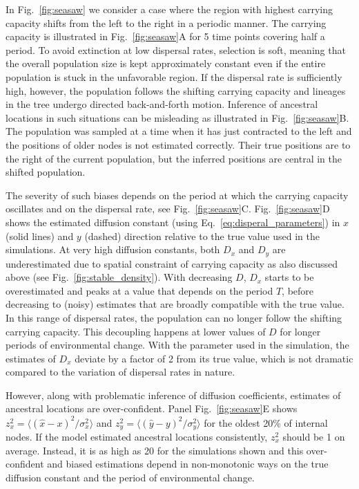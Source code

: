 \documentclass[aps,rmp, twocolumn]{revtex4}
\begin{document}
In Fig.~\ref{fig:seasaw} we consider a case where the region with highest carrying capacity shifts from the left to the right in a periodic manner.
The carrying capacity is illustrated in Fig.~\ref{fig:seasaw}A for 5 time points covering half a period.
To avoid extinction at low dispersal rates, selection is soft, meaning that the overall population size is kept approximately constant even if the entire population is stuck in the unfavorable region.
If the dispersal rate is sufficiently high, however, the population follows the shifting carrying capacity and lineages in the tree undergo directed back-and-forth motion.
Inference of ancestral locations in such situations can be misleading as illustrated in Fig.~\ref{fig:seasaw}B.
The population was sampled at a time when it has just contracted to the left and the positions of older nodes is not estimated correctly.
Their true positions are to the right of the current population, but the inferred positions are central in the shifted population.

The severity of such biases depends on the period at which the carrying capacity oscillates and on the dispersal rate, see  Fig.~\ref{fig:seasaw}C.
Fig.~\ref{fig:seasaw}D shows the estimated diffusion constant (using Eq.~\ref{eq:disperal_parameters}) in $x$ (solid lines) and $y$ (dashed) direction relative to the true value used in the simulations.
At very high diffusion constants, both $D_x$ and $D_y$ are underestimated due to spatial constraint of carrying capacity as also discussed above (see Fig.~\ref{fig:stable_density}).
With decreasing $D$, $D_x$ starts to be overestimated and peaks at a value that depends on the period $T$, before decreasing to (noisy) estimates that are broadly compatible with the true value.
In this range of dispersal rates, the population can no longer follow the shifting carrying capacity.
This decoupling happens at lower values of $D$ for longer periods of environmental change.
With the parameter used in the simulation, the estimates of $D_x$ deviate by a factor of 2 from its true value, which is not dramatic compared to the variation of dispersal rates in nature.

However, along with problematic inference of diffusion coefficients, estimates of ancestral locations are over-confident.
Panel Fig.~\ref{fig:seasaw}E shows $z_x^2 = \langle (\hat{x} - x)^2/\sigma_x^2 \rangle$ and $z_y^2=\langle (\hat{y} - y)^2/\sigma_y^2\rangle$ for the oldest 20\% of internal nodes.
If the model estimated ancestral locations consistently, $z_x^2$ should be 1 on average.
Instead, it is as high as 20 for the simulations shown and this over-confident and biased estimations depend in non-monotonic ways on the true diffusion constant and the period of environmental change.
\end{document}
